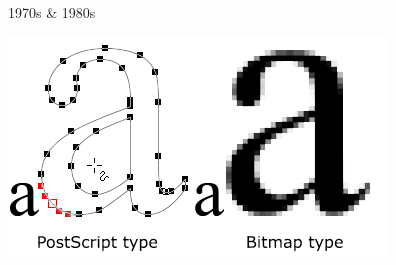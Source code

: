 \documentclass{lug}
\begin{document}
\begin{frame}{1970s \& 1980s}
\begin{minipage}{.35\textwidth}
        \includegraphics[width=\textwidth]{graphics/postscript_text}
    \end{minipage}
\end{frame}
\end{document}
